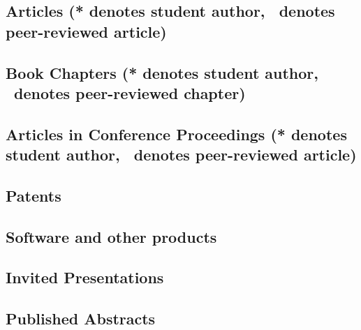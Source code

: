 \documentclass[10pt]{article}
\begin{document}
    \subsection[Articles]{Articles (* denotes student author, \textdagger\ denotes peer-reviewed article)}
    \begin{refsection}
        \nocite{*}
        \printbibliography[heading=none,type=article]
    \end{refsection}

    \subsection[Book Chapters]{Book Chapters (* denotes student author, \textdagger\ denotes peer-reviewed chapter)}
    \begin{refsection}
        \nocite{*}
        \printbibliography[heading=none,type=incollection]
    \end{refsection}
    \subsection[Articles in Conference Proceedings]{Articles in Conference Proceedings (* denotes student author, \textdagger\ denotes peer-reviewed article)}
    \begin{refsection}
        \nocite{*}
        \printbibliography[heading=none,type=inproceedings]
    \end{refsection}
  \subsection{Patents}
    \begin{refsection}
        \nocite{*}
        \printbibliography[heading=none,type=patent]
       \end{refsection}
  \subsection{Software and other products}
      
    \subsection{Invited Presentations}
    \begin{enumerate}
    
    
    \end{enumerate}
    \subsection{Published Abstracts}
    \begin{enumerate}
    
    
    \end{enumerate}
\end{document}
